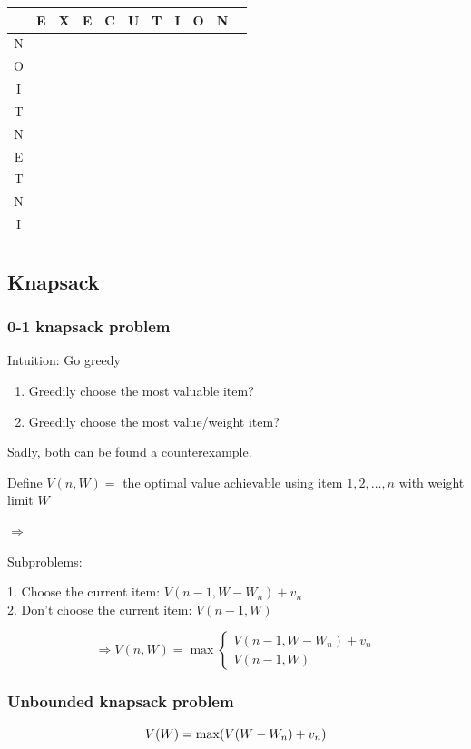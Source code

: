 \documentclass[12pt,a4paper]{article}
\begin{document}
\begin{tabular}{|c|c|c|c|c|c|c|c|c|c|c|}
  \hline
  & E & X & E & C & U & T & I & O & N & \\
  \hline
  N & & & & & & & & & & \\
  \hline
  O & & & & & & & & & & \\
  \hline
  I & & & & & & & & & & \\
  \hline
  T & & & & & & & & & & \\
  \hline
  N & & & & & & & & & & \\
  \hline
  E & & & & & & & & & & \\
  \hline
  T & & & & & & & & & & \\
  \hline
  N & & & & & & & & & & \\
  \hline
  I & & & & & & & & & & \\
  \hline
  & & & & & & & & & & \\
  \hline
\end{tabular}

\subsection*{Knapsack}

\subsubsection*{0-1 knapsack problem}


Intuition: Go greedy

\begin{enumerate}
  \item Greedily choose the most valuable item?
  \item Greedily choose the most value/weight item?
\end{enumerate}

Sadly, both can be found a counterexample.

Define $V(n, W) = $ the optimal value achievable using item 
$1,2, \dots, n$ with weight limit $W$

$\Rightarrow$

Subproblems:

1. Choose the current item: $V(n - 1, W - W_n) + v_n$ \\
2. Don't choose the current item: $V(n - 1, W)$


\[
\Rightarrow
V(n, W) = \max \left\{
\begin{array}{l}
    V(n - 1, W - W_n) + v_n \\
    V(n - 1, W)
\end{array}
\right.
\]

\subsubsection*{Unbounded knapsack problem}

\[
V(W) = \max (V(W - W_n) + v_n) \\
\]
\end{document}

